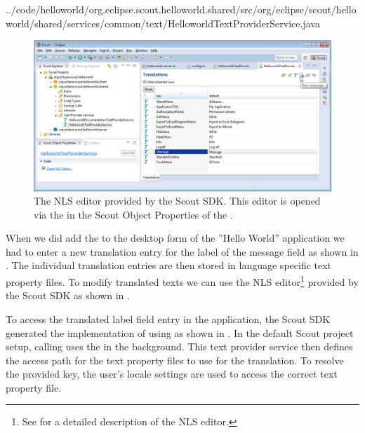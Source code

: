 \documentclass[a4paper,10pt,twoside]{book}
\begin{document}

{../code/helloworld/org.eclipse.scout.helloworld.shared/src/org/eclipse/scout/helloworld/shared/services/common/text/HelloworldTextProviderService.java}

\begin{figure}
\includegraphics[width=14cm]{sdk_nls_editor.png} 
\caption{The NLS editor provided by the Scout SDK. This editor is opened via the  in the Scout Object Properties of the .
}
\end{figure}

When we did add the  to the desktop form of the ''Hello World'' application we had to enter a new translation entry for the label of the message field as shown in .
The individual translation entries are then stored in language specific text property files.
To modify translated texts we can use the NLS editor\footnote{
See  for a detailed description of the NLS editor.
} 
provided by the Scout SDK as shown in .

To access the translated label field entry in the application, the Scout SDK generated the implementation of  using  as shown in .
In the default Scout project setup, calling  uses the  in the background.
This text provider service then defines the access path for the text property files to use for the translation.
To resolve the provided key, the user's locale settings are used to access the correct text property file.
\end{document}
